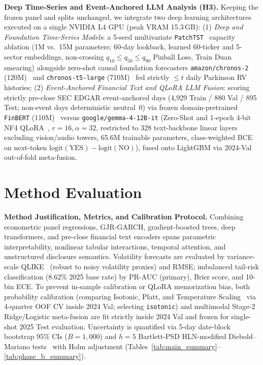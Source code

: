 \documentclass[11pt,a4paper]{article}
\begin{document}
\textbf{Deep Time-Series and Event-Anchored LLM Analysis (H3).} Keeping the
frozen panel and splits unchanged, we integrate two deep learning architectures
executed on a single NVIDIA L4 GPU (peak VRAM 15.3\,GB):
(1) \emph{Deep and Foundation Time-Series Models}: a 5-seed multivariate
\texttt{PatchTST}~\cite{nie2023patchtst} capacity ablation (1M vs.\ 15M
parameters; 60-day lookback, learned 60-ticker and 5-sector embeddings,
non-crossing $q_{10}\le q_{50}\le q_{90}$ Pinball Loss, Train Duan
smearing) alongside zero-shot causal foundation forecasters
\texttt{amazon/chronos-2} (120M)~\cite{ansari2025chronos2} and
\texttt{chronos-t5-large} (710M)~\cite{ansari2024chronos} fed strictly
$\le t$ daily Parkinson RV histories;
(2) \emph{Event-Anchored Financial Text and QLoRA LLM Fusion}: scoring
strictly pre-close SEC EDGAR event-anchored days (4,929 Train / 880 Val /
895 Test; non-event days deterministic neutral~0) via frozen
domain-pretrained \texttt{FinBERT} (110M)~\cite{araci2019finbert} versus
\texttt{google/gemma-4-12B-it} (Zero-Shot and 1-epoch 4-bit NF4
QLoRA~\cite{dettmers2023qlora}, $r=16, \alpha=32$, restricted to 328
text-backbone linear layers excluding vision/audio towers, 65.6M trainable
parameters, class-weighted BCE on next-token $\text{logit}(\text{YES}) -
\text{logit}(\text{NO})$), fused onto LightGBM via 2024-Val out-of-fold
meta-fusion.

\section{Method Evaluation}

\textbf{Method Justification, Metrics, and Calibration Protocol.} Combining
econometric panel regressions, GJR-GARCH, gradient-boosted trees, deep
transformers, and pre-close financial text encoders spans parametric
interpretability, nonlinear tabular interactions, temporal attention, and
unstructured disclosure semantics. Volatility forecasts are evaluated by
variance-scale QLIKE~\cite{patton2011} (robust to noisy volatility proxies)
and RMSE; imbalanced tail-risk classification (8.62\% 2025 base rate) by
PR-AUC (primary), Brier score, and 10-bin ECE. To prevent in-sample calibration
or QLoRA memorization bias, both probability calibration (comparing Isotonic,
Platt, and Temperature Scaling~\cite{guo2017calibration} via 4-quarter OOF CV
inside 2024 Val; selecting \texttt{isotonic}) and multimodal Stage-2
Ridge/Logistic meta-fusion are fit strictly inside 2024 Val and frozen for
single-shot 2025 Test evaluation. Uncertainty is quantified via 5-day
date-block bootstrap 95\% CIs ($B=1{,}000$) and $h=5$ Bartlett-PSD
HLN-modified Diebold--Mariano tests~\cite{harvey1997} with Holm adjustment
(Tables~\ref{tab:main_summary}--\ref{tab:phase_b_summary}).
\end{document}
